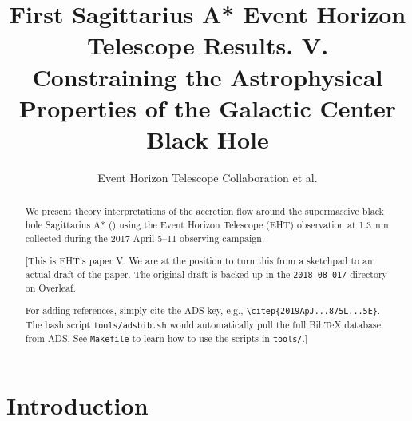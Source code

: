 \documentclass[twocolumn,twocolappendix,tighten,dvipsnames,linenumbers]{aastex63}
\begin{document}
\title{First Sagittarius A* Event Horizon Telescope Results. V.\\
  Constraining the Astrophysical Properties of the Galactic Center Black Hole}

\author{Event Horizon Telescope Collaboration et al.}


\received{\today}
\revised{\today}

\begin{abstract}
  We present theory interpretations of the accretion flow around the
  supermassive black hole Sagittarius A* (\sgra) using the Event
  Horizon Telescope (EHT) observation at 1.3\,mm collected during the
  2017 April 5--11 observing campaign.

  \color{BrickRed}

  [This is EHT's \sgra paper V.
  We are at the position to turn this from a sketchpad to an actual
  draft of the paper.
  The original draft is backed up in the \texttt{2018-08-01/}
  directory on Overleaf.

  For adding references, simply cite the ADS key, e.g.,
  \texttt{\textbackslash citep\{2019ApJ...875L...5E\}}.
  The bash script \texttt{tools/adsbib.sh} would automatically pull
  the full BibTeX database from ADS.
  See \texttt{Makefile} to learn how to use the scripts in
  \texttt{tools/}.]
\end{abstract}


\tableofcontents

\clearpage

\section{Introduction}
\end{document}
